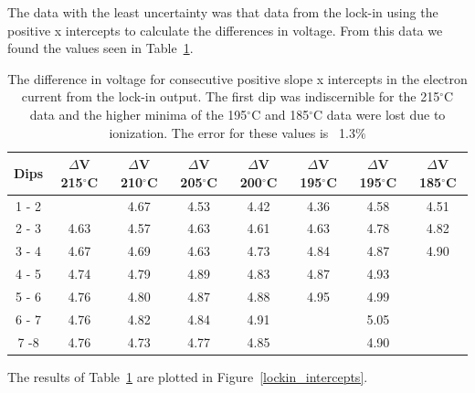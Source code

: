 \documentclass[prb,preprint]{revtex4-1}
\begin{document}
 The data with the least uncertainty was that data from the lock-in using the positive x intercepts to calculate the differences in voltage. From this data we found the values seen in Table~\ref{hg_lockin_table}.

\begin{table}[h!]
\centering

\caption{The difference in voltage for consecutive positive slope x intercepts in the electron current from the lock-in output. The first dip was indiscernible for the 215$^{\circ}$C data and the higher minima of the 195$^{\circ}$C and 185$^{\circ}$C data were lost due to ionization. The error for these values is ~1.3$\%$}

\begin{ruledtabular}
\begin{tabular}{c c c c c c c c}
Dips & $\Delta$V 215$^{\circ}$C & $\Delta$V 210$^{\circ}$C  & $\Delta$V 205$^{\circ}$C &$\Delta$V 200$^{\circ}$C  & $\Delta$V 195$^{\circ}$C  & $\Delta$V 195$^{\circ}$C &$\Delta$V 185$^{\circ}$C  \\
\hline	%
1 - 2 &         & 4.67 & 4.53 & 4.42 & 4.36 & 4.58 & 4.51 \\
2 - 3 & 4.63 & 4.57 & 4.63 & 4.61 & 4.63 & 4.78 & 4.82 \\
3 - 4 & 4.67 & 4.69 & 4.63 & 4.73 & 4.84 & 4.87 & 4.90 \\
4 - 5 & 4.74 & 4.79 & 4.89 & 4.83 & 4.87 & 4.93 &         \\
5 - 6 & 4.76 & 4.80 & 4.87 & 4.88 & 4.95 & 4.99 &         \\
6 - 7 & 4.76 & 4.82 & 4.84 & 4.91 &         & 5.05 &         \\
7 -8  & 4.76 & 4.73 & 4.77 & 4.85 &         & 4.90 &         \\

\end{tabular}
\end{ruledtabular}
\label{hg_lockin_table}
\end{table}

The results of Table~\ref{hg_lockin_table} are plotted in Figure~\ref{lockin_intercepts}. 
\end{document}
